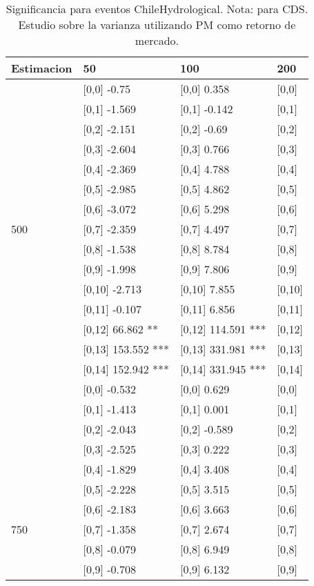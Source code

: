 \begin{table}

\caption{Significancia para eventos ChileHydrological. Nota: para CDS. Estudio sobre la varianza utilizando PM como retorno de mercado.}
\centering
\begin{tabular}[t]{llll}
\toprule
Estimacion & 50 & 100 & 200\\
\midrule
 & {}[0,0] -0.75 & {}[0,0] 0.358 & {}[0,0]\\
 & {}[0,1] -1.569 & {}[0,1] -0.142 & {}[0,1]\\
 & {}[0,2] -2.151 & {}[0,2] -0.69 & {}[0,2]\\
 & {}[0,3] -2.604 & {}[0,3] 0.766 & {}[0,3]\\
 & {}[0,4] -2.369 & {}[0,4] 4.788 & {}[0,4]\\
\addlinespace
 & {}[0,5] -2.985 & {}[0,5] 4.862 & {}[0,5]\\
 & {}[0,6] -3.072 & {}[0,6] 5.298 & {}[0,6]\\
500 & {}[0,7] -2.359 & {}[0,7] 4.497 & {}[0,7]\\
 & {}[0,8] -1.538 & {}[0,8] 8.784 & {}[0,8]\\
 & {}[0,9] -1.998 & {}[0,9] 7.806 & {}[0,9]\\
\addlinespace
 & {}[0,10] -2.713 & {}[0,10] 7.855 & {}[0,10]\\
 & {}[0,11] -0.107 & {}[0,11] 6.856 & {}[0,11]\\
 & {}[0,12] 66.862 ** & {}[0,12] 114.591 *** & {}[0,12]\\
 & {}[0,13] 153.552 *** & {}[0,13] 331.981 *** & {}[0,13]\\
 & {}[0,14] 152.942 *** & {}[0,14] 331.945 *** & {}[0,14]\\
\addlinespace
 & {}[0,0] -0.532 & {}[0,0] 0.629 & {}[0,0]\\
 & {}[0,1] -1.413 & {}[0,1] 0.001 & {}[0,1]\\
 & {}[0,2] -2.043 & {}[0,2] -0.589 & {}[0,2]\\
 & {}[0,3] -2.525 & {}[0,3] 0.222 & {}[0,3]\\
 & {}[0,4] -1.829 & {}[0,4] 3.408 & {}[0,4]\\
\addlinespace
 & {}[0,5] -2.228 & {}[0,5] 3.515 & {}[0,5]\\
 & {}[0,6] -2.183 & {}[0,6] 3.663 & {}[0,6]\\
750 & {}[0,7] -1.358 & {}[0,7] 2.674 & {}[0,7]\\
 & {}[0,8] -0.079 & {}[0,8] 6.949 & {}[0,8]\\
 & {}[0,9] -0.708 & {}[0,9] 6.132 & {}[0,9]\\

\end{tabular}
\end{table}
